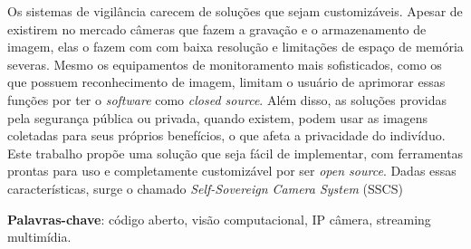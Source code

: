 \documentclass[12pt, %
openright, 
oneside, %
a4paper,    %
brazil]{facom-ufu-abntex2}
\begin{document}



\begin{resumo} %
	Os sistemas de vigilância carecem de soluções que sejam customizáveis.
	Apesar de existirem no mercado câmeras que fazem a gravação e o armazenamento
	de imagem, elas o fazem com com baixa resolução e limitações de espaço de
	memória severas. Mesmo os equipamentos de monitoramento mais sofisticados, como
	os que possuem reconhecimento de imagem, limitam o usuário de aprimorar essas
	funções por ter o \textit{\foreignlanguage{english}{software}} como
	\textit{\foreignlanguage{english}{closed source}}. Além disso, as soluções
	providas pela segurança pública ou privada, quando existem, podem usar as
	imagens coletadas para seus próprios benefícios, o que afeta a privacidade do
	indivíduo. Este trabalho propõe uma solução que seja fácil de implementar, com
	ferramentas prontas para uso e completamente customizável por ser
	\textit{\foreignlanguage{english}{open source}}. Dadas essas características,
	surge o chamado \textit{\foreignlanguage{english}{Self-Sovereign Camera
			System}} (SSCS) \vspace{\onelineskip}

	\noindent
	\textbf{Palavras-chave}: código  aberto, visão computacional, IP
	câmera, streaming multimídia.  %
\end{resumo}
\end{document}
